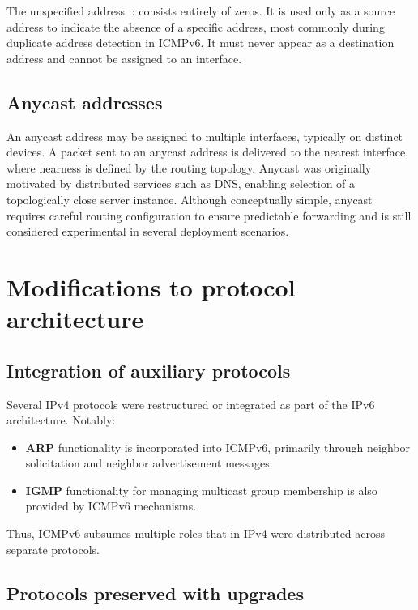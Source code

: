 The unspecified address :: consists entirely of zeros. It is used only as a source address to indicate the absence of a specific address, most commonly during duplicate address detection in ICMPv6. It must never appear as a destination address and cannot be assigned to an interface.

\subsection{Anycast addresses}

An anycast address may be assigned to multiple interfaces, typically on distinct devices. A packet sent to an anycast address is delivered to the nearest interface, where nearness is defined by the routing topology. Anycast was originally motivated by distributed services such as DNS, enabling selection of a topologically close server instance. Although conceptually simple, anycast requires careful routing configuration to ensure predictable forwarding and is still considered experimental in several deployment scenarios.

\section{Modifications to protocol architecture}

\subsection{Integration of auxiliary protocols}

Several IPv4 protocols were restructured or integrated as part of the IPv6 architecture. Notably:

\begin{itemize}
\item \textbf{ARP} functionality is incorporated into ICMPv6, primarily through neighbor solicitation and neighbor advertisement messages.
\item \textbf{IGMP} functionality for managing multicast group membership is also provided by ICMPv6 mechanisms.
\end{itemize}

Thus, ICMPv6 subsumes multiple roles that in IPv4 were distributed across separate protocols.

\subsection{Protocols preserved with upgrades}

